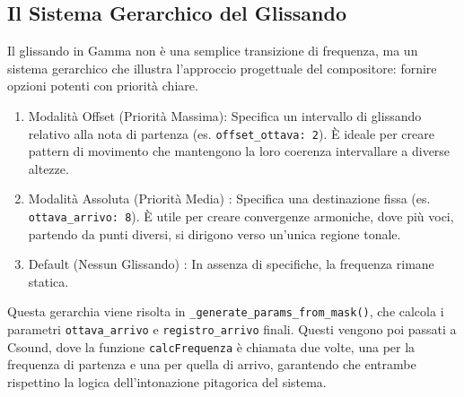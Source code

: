 \subsection{Il Sistema Gerarchico del Glissando}
Il glissando in Gamma non è una semplice transizione di frequenza, ma un sistema gerarchico che illustra l'approccio progettuale del compositore: fornire opzioni potenti con priorità chiare.

\begin{enumerate}
    \item Modalità Offset (Priorità Massima): Specifica un intervallo di glissando relativo alla nota di partenza (es. \texttt{offset\_ottava: 2}). È ideale per creare pattern di movimento che mantengono la loro coerenza intervallare a diverse altezze.
    \item Modalità Assoluta (Priorità Media) : Specifica una destinazione fissa (es. \texttt{ottava\_arrivo: 8}). È utile per creare convergenze armoniche, dove più voci, partendo da punti diversi, si dirigono verso un'unica regione tonale.
    \item Default (Nessun Glissando) : In assenza di specifiche, la frequenza rimane statica.
\end{enumerate}
Questa gerarchia viene risolta in \texttt{\_generate\_params\_from\_mask()}, che calcola i parametri \texttt{ottava\_arrivo} e \texttt{registro\_arrivo} finali. Questi vengono poi passati a Csound, dove la funzione \texttt{calcFrequenza} è chiamata due volte, una per la frequenza di partenza e una per quella di arrivo, garantendo che entrambe rispettino la logica dell'intonazione pitagorica del sistema.